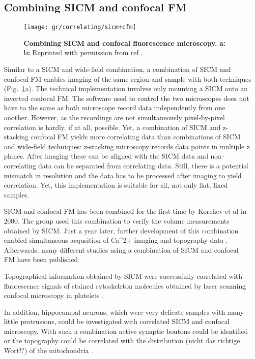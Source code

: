\subsection{Combining SICM and confocal FM}

\begin{figure}
  \texttt{[image: gr/correlating/sicm+cfm]}
  \caption{%
    \textbf{Combining SICM and confocal fluorescence microscopy.}
    \textbf{a:}
    \textbf{b:} 
    Reprinted with permission from ref \cite{}.
  }
  \label{fig:sicm+cfm}
\end{figure}

Similar to a SICM and wide-field combination, a combination of SICM and confocal FM enables
imaging of the same region and sample with both techniques (Fig.~\ref{fig:sicm+cfm}a). The technical
implementation involves only mounting a SICM onto an inverted confocal FM. The software used to
control the two microscopes does not have to the same as both microscope record data independently 
from one another. However, as the recordings are not simultaneously pixel-by-pixel correlation is hardly,
if at all, possible. Yet, a combination of SICM and z-stacking confocal FM yields more correlating data
than combinations of SICM and wide-field techniques: z-stacking microscopy records data points in 
multiple z planes. After imaging these can be aligned with the SICM data and non-correlating data can be
separated from correlating data. Still, there is a potential mismatch in resolution and the data has to 
be processed after imaging to yield correlation. Yet, this implementation is suitable for all, not only 
flat, fixed samples.

SICM and confocal FM has been combined for the first time by Korchev et al \cite{Korchev2000} in
2000. The group used this combination to verify the volume measurements obtained by SICM. Just a 
year later, further development of this combination enabled simultaneous acqusition of Ca^{2+} 
imaging and topography data \cite{Shevchuk2001}. Afterwards, many different studies using a combination
of SICM and confocal FM have been published:

Topographical information obtained by SICM were successfully correlated with fluorescence signals
of stained cytoskeleton molecules obtained by laser scanning confocal microscopy in platelets 
\cite{Seifert2017}. 

In addition, hippocampal neurons, which were very delicate samples with many little protrusions, 
could be investigated with correlated SICM and confocal microscopy. With such a combination active
synaptic boutons could be identified \cite{Novak2013} or the topography could be correlated with 
the distribution (nicht das richtige Wort!?) of the mitochondria \cite{Takahashi2019}.

